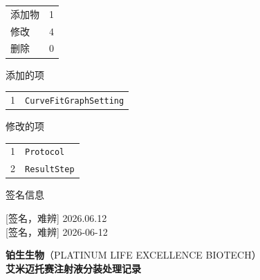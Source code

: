 \documentclass[UTF8,10pt,a4paper,fontset=fandol]{ctexart}
\newcommand{\fieldvalue}[1]{#1}
\newcommand{\handwritten}[1]{#1}
\begin{document}
\vspace{1em}

\begin{tabular}{@{}l@{\quad}l@{}}
添加物 &
\fieldvalue{1} \\[2pt]
修改 &
\fieldvalue{4} \\[2pt]
删除 &
\fieldvalue{0}
\end{tabular}

\vspace{1em}

\noindent 添加的项

\begin{tabular}{@{}r@{\quad}l@{}}
1 &
\fieldvalue{\texttt{CurveFitGraphSetting}}
\end{tabular}

\vspace{1em}

\noindent 修改的项

\begin{tabular}{@{}r@{\quad}l@{}}
1 &
\fieldvalue{\texttt{Protocol}} \\[2pt]
2 &
\fieldvalue{\texttt{ResultStep}}
\end{tabular}

\vspace{2em}

\noindent 签名信息

\vfill

\begin{flushright}
\fieldvalue{\handwritten{[签名，难辨]}}\quad
\fieldvalue{\handwritten{2026.06.12}}\\[1em]
\fieldvalue{\handwritten{[签名，难辨]}}\quad
\fieldvalue{\handwritten{2026-06-12}}
\end{flushright}

\newpage

\begin{center}
\textbf{铂生生物}（PLATINUM LIFE EXCELLENCE BIOTECH）\\[2pt]
\textbf{艾米迈托赛注射液分装处理记录}
\end{center}
\end{document}
